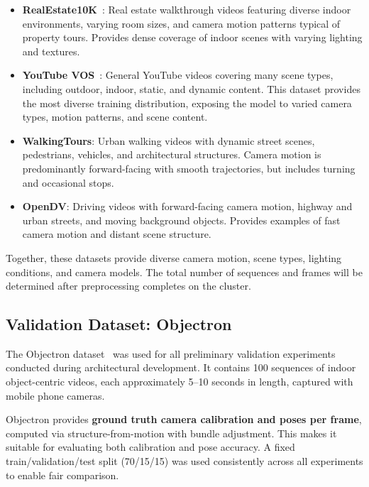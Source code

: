 \begin{itemize}
    \item \textbf{RealEstate10K}~\parencite{zhou2018realestate10k}: Real estate walkthrough videos featuring diverse indoor environments, varying room sizes, and camera motion patterns typical of property tours. Provides dense coverage of indoor scenes with varying lighting and textures.

    \item \textbf{YouTube VOS}~\parencite{xu2018youtubevos}: General YouTube videos covering many scene types, including outdoor, indoor, static, and dynamic content. This dataset provides the most diverse training distribution, exposing the model to varied camera types, motion patterns, and scene content.

    \item \textbf{WalkingTours}: Urban walking videos with dynamic street scenes, pedestrians, vehicles, and architectural structures. Camera motion is predominantly forward-facing with smooth trajectories, but includes turning and occasional stops.

    \item \textbf{OpenDV}: Driving videos with forward-facing camera motion, highway and urban streets, and moving background objects. Provides examples of fast camera motion and distant scene structure.
\end{itemize}

Together, these datasets provide diverse camera motion, scene types, lighting conditions, and camera models. The total number of sequences and frames will be determined after preprocessing completes on the cluster.

\subsection{Validation Dataset: Objectron}\label{sec:validation-dataset}

The Objectron dataset~\parencite{ahmadyan2021objectron} was used for all preliminary validation experiments conducted during architectural development. It contains 100 sequences of indoor object-centric videos, each approximately 5--10 seconds in length, captured with mobile phone cameras.

Objectron provides \textbf{ground truth camera calibration and poses per frame}, computed via structure-from-motion with bundle adjustment. This makes it suitable for evaluating both calibration and pose accuracy. A fixed train/validation/test split (70/15/15) was used consistently across all experiments to enable fair comparison.


